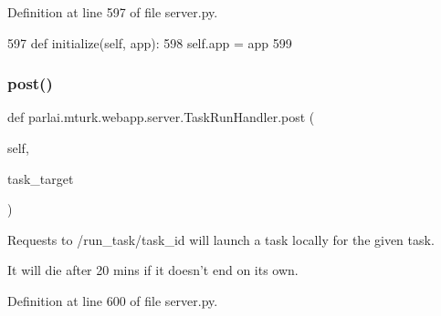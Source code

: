 Definition at line 597 of file server.\+py.


\begin{DoxyCode}
597     \textcolor{keyword}{def }initialize(self, app):
598         self.app = app
599 
\end{DoxyCode}
\mbox{\label{classparlai_1_1mturk_1_1webapp_1_1server_1_1TaskRunHandler_a957a29eb2fcfec6fba5890470387e1d0}} 
\subsubsection{\texorpdfstring{post()}{post()}}
{\footnotesize\ttfamily def parlai.\+mturk.\+webapp.\+server.\+Task\+Run\+Handler.\+post (\begin{DoxyParamCaption}\item[{}]{self,  }\item[{}]{task\+\_\+target }\end{DoxyParamCaption})}

\begin{DoxyVerb}Requests to /run_task/{task_id} will launch a task locally for the given task.

It will die after 20 mins if it doesn't end on its own.
\end{DoxyVerb}
 

Definition at line 600 of file server.\+py.



